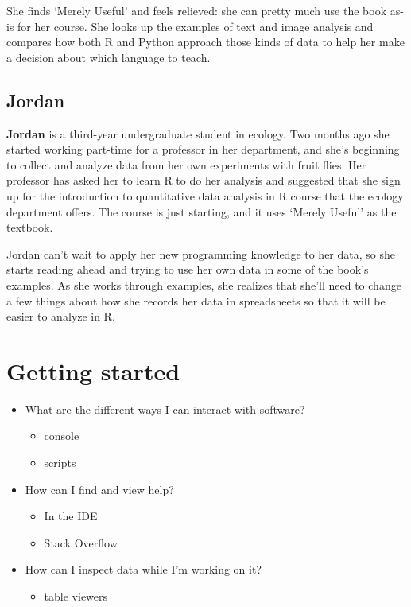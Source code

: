 \documentclass[]{Nemilov}
\providecommand{\tightlist}{%
  \setlength{\itemsep}{0pt}\setlength{\parskip}{0pt}}
\begin{document}
She finds `Merely Useful' and feels relieved:
she can pretty much use the book as-is for her course.
She looks up the examples of text and image analysis
and compares how both R and Python approach those kinds of data
to help her make a decision about which language to teach.

\hypertarget{jordan}{%
\subsection{Jordan}\label{jordan}}

\textbf{Jordan} is a third-year undergraduate student in ecology.
Two months ago she started working part-time for a professor in her department,
and she's beginning to collect and analyze data from her own experiments with fruit flies.
Her professor has asked her to learn R to do her analysis
and suggested that she sign up for the introduction to quantitative data analysis in R course
that the ecology department offers.
The course is just starting,
and it uses `Merely Useful' as the textbook.

Jordan can't wait to apply her new programming knowledge to her data,
so she starts reading ahead and trying to use her own data in some of the book's examples.
As she works through examples,
she realizes that she'll need to change a few things about how she records her data in spreadsheets
so that it will be easier to analyze in R.

\hypertarget{getting-started}{%
\section{Getting started}\label{getting-started}}

\begin{itemize}
\tightlist
\item
  What are the different ways I can interact with software?

  \begin{itemize}
  \tightlist
  \item
    console
  \item
    scripts
  \end{itemize}
\item
  How can I find and view help?

  \begin{itemize}
  \tightlist
  \item
    In the IDE
  \item
    Stack Overflow
  \end{itemize}
\item
  How can I inspect data while I'm working on it?

  \begin{itemize}
  \tightlist
  \item
    table viewers
  \end{itemize}
\end{itemize}
\end{document}
